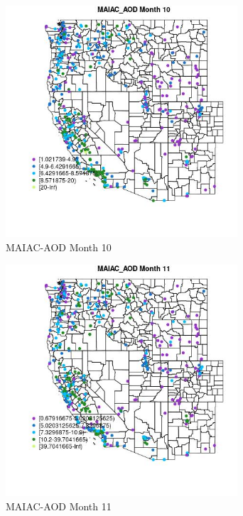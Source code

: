 \begin{figure} 
\centering  
\includegraphics[width=0.77\textwidth]{Code_Outputs/ML_input_report_ML_input_PM25_Step5_part_d_de_duplicated_aves_ML_input_MapObsMo10MAIAC_AOD.jpg} 
\caption{\label{fig:ML_input_report_ML_input_PM25_Step5_part_d_de_duplicated_aves_ML_inputMapObsMo10MAIAC_AOD}MAIAC-AOD Month 10} 
\end{figure} 
 

\begin{figure} 
\centering  
\includegraphics[width=0.77\textwidth]{Code_Outputs/ML_input_report_ML_input_PM25_Step5_part_d_de_duplicated_aves_ML_input_MapObsMo11MAIAC_AOD.jpg} 
\caption{\label{fig:ML_input_report_ML_input_PM25_Step5_part_d_de_duplicated_aves_ML_inputMapObsMo11MAIAC_AOD}MAIAC-AOD Month 11} 
\end{figure} 
 

